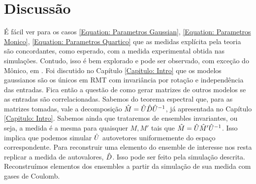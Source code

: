 \section{Discussão}

É fácil ver para os casos \ref{Equation: Parametros Gaussian}, \ref{Equation: Parametros Monico}, \ref{Equation: Parametros Quartico} que as medidas explícita pela teoria são concordantes, como esperado, com a medida experimental obtida nas simulações. Contudo, isso é bem explorado e pode ser observado, com exceção do Mônico, em \cite{Chafa2018}. Foi discutido no Capítulo \ref{Capitulo: Intro} que os modelos gaussianos são os únicos em RMT com invariância por rotação e independência das entradas. Fica então a questão de como gerar matrizes de outros modelos se as entradas são correlacionadas. Sabemos do teorema espectral que, para as matrizes tomadas, vale a decomposição $\hat M = \hat U \hat D \hat U^{-1}$, já apresentada no Capítulo \ref{Capitulo: Intro}. Sabemos ainda que trataremos de ensembles invariantes, ou seja, a medida é a mesma para quaisquer $M, M'$ tais que $\hat M = \hat U \hat M' \hat U^{-1}$. Isso implica que podemos simular $\hat U$ autovetores uniformemente do espaço correspondente. Para reconstruir uma elemento do ensemble de interesse nos resta replicar a medida de autovalores, $\hat D$. Isso pode ser feito pela simulação descrita. Reconstruímos elementos dos ensembles a partir da simulação de sua medida com gases de Coulomb.